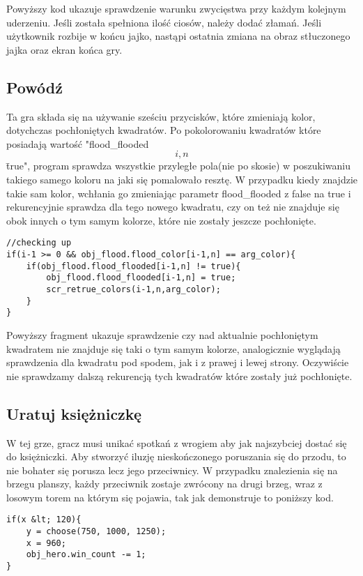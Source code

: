 \documentclass[openright]{xmgr}
\begin{document}
Powyższy kod ukazuje sprawdzenie warunku zwycięstwa przy każdym kolejnym uderzeniu. Jeśli została spełniona ilość ciosów, należy dodać złamań. Jeśli użytkownik rozbije w końcu jajko, nastąpi ostatnia zmiana na obraz stłuczonego jajka oraz ekran końca gry.


\subsection{Powódź}
Ta gra składa się na używanie sześciu przycisków, które zmieniają kolor, dotychczas pochłoniętych kwadratów.  Po pokolorowaniu kwadratów które posiadają wartość "flood\_flooded\[i,n\] \= true", program sprawdza wszystkie przyległe pola(nie po skosie) w poszukiwaniu takiego samego koloru na jaki się pomalowało resztę. W przypadku kiedy znajdzie takie sam kolor, wchłania go zmieniając parametr flood\_flooded z false na true i rekurencyjnie sprawdza dla tego nowego kwadratu, czy on też nie znajduje się obok innych o tym samym kolorze, które nie zostały jeszcze pochłonięte.

\begin{lstlisting}[caption={Fragment  skryptu scr\_retrue\_colors}]
//checking up
if(i-1 >= 0 && obj_flood.flood_color[i-1,n] == arg_color){
    if(obj_flood.flood_flooded[i-1,n] != true){     
        obj_flood.flood_flooded[i-1,n] = true;
        scr_retrue_colors(i-1,n,arg_color);
    }   
}
\end{lstlisting}

Powyższy fragment ukazuje sprawdzenie czy nad aktualnie pochłoniętym kwadratem nie znajduje się taki o tym samym kolorze, analogicznie wyglądają sprawdzenia dla kwadratu pod spodem, jak i z prawej i lewej strony. Oczywiście nie sprawdzamy dalszą rekurencją tych kwadratów które zostały już pochłonięte.


\subsection{Uratuj księżniczkę}
W tej grze, gracz musi unikać spotkań z wrogiem aby jak najszybciej dostać się do księżniczki. Aby stworzyć iluzję nieskończonego poruszania się do przodu, to nie bohater się porusza lecz jego przeciwnicy. W przypadku znalezienia się na brzegu planszy, każdy przeciwnik zostaje zwrócony na drugi brzeg, wraz z losowym torem na którym się pojawia, tak jak demonstruje to poniższy kod.

\begin{lstlisting}[caption={Fragment kodu obiektu obj\_orc}]
if(x &lt; 120){
    y = choose(750, 1000, 1250);
    x = 960;
    obj_hero.win_count -= 1;
}
\end{lstlisting}
\end{document}
